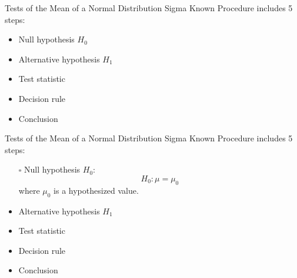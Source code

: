 \documentclass[
  10pt,
  ignorenonframetext,
]{beamer}
\providecommand{\tightlist}{%
  \setlength{\itemsep}{0pt}\setlength{\parskip}{0pt}}
\begin{document}
\begin{frame}{Tests of the Mean of a Normal Distribution Sigma Known}
\protect\hypertarget{tests-of-the-mean-of-a-normal-distribution-sigma-known-3}{}
Procedure includes 5 steps:

\begin{itemize}
\tightlist
\item
  Null hypothesis \(H_0\)
\item
  Alternative hypothesis \(H_1\)
\item
  Test statistic
\item
  Decision rule
\item
  Conclusion
\end{itemize}
\end{frame}

\begin{frame}{Tests of the Mean of a Normal Distribution Sigma Known}
\protect\hypertarget{tests-of-the-mean-of-a-normal-distribution-sigma-known-4}{}
Procedure includes 5 steps:

\begin{itemize}
    \item [$\square$] Null hypothesis $H_0$:\\
    $$
    H_0: \mu = \mu_{0}
    $$
    where $\mu_{0}$ is a hypothesized value.
    \item Alternative hypothesis $H_1$
    \item Test statistic
    \item Decision rule
    \item Conclusion
\end{itemize}
\end{frame}
\end{document}

